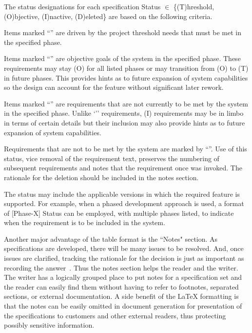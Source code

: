The status designations for each specification Status $\in$ \{(T)hreshold, (O)bjective, (I)nactive, (D)eleted\} are based on the following criteria.
\begin{my_description}
{
\item [\OneRqmtThreshold] Items marked ``\OneRqmtThreshold'' are driven by the project threshold needs that must be met in the specified phase.

\item [\OneRqmtObjective] Items marked ``\OneRqmtObjective'' are objective goals of the system in the specified phase. These requirements may stay (O) for all listed phases or may transition from (O) to (T) in future phases. This provides hints as to future expansion of system capabilities so the design can account for the feature without significant later rework.

\item [\OneRqmtInactive] Items marked ``\OneRqmtInactive'' are requirements that are not currently to be met by the system in the specified phase. Unlike `\OneRqmtObjective'' requirements, (I) requirements may be in limbo in terms of certain details but their inclusion may also provide hints as to future expansion of system capabilities. 

\item [\OneRqmtDeleted] Requirements that are not to be met by the system are marked by ``\OneRqmtDeleted''. Use of this status, vice removal of the requirement text, preserves the numbering of subsequent requirements and notes that the requirement once was invoked.
The rationale for the deletion should be included in the notes section. 
}
\end{my_description}

The status may include the applicable versions in which the required feature is supported.
For example, when a phased development approach is used, a format of [Phase-X] Status can be employed, with multiple phases listed, to indicate when the requirement is to be included in the system.

\if@showreqnotes
Another major advantage of the table format is the ``Notes" section.
As specifications are developed, there will be many issues to be resolved.
And, once issues are clarified, tracking the rationale for the decision is just as important as recording the answer~\cite{ref__Brooks_MMM}.
Thus the notes section helps the reader and the writer.
The writer has a logically grouped place to put notes for a specification set and the reader can easily find them without having to refer to footnotes, separated sections, or external documentation.
A side benefit of the \LaTeX{} formatting is that the notes can be easily omitted in document generation for presentation of the specifications to customers and other external readers, thus protecting possibly sensitive information.
\fi%
